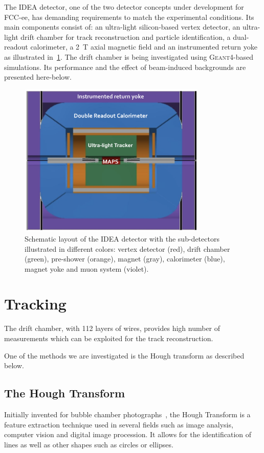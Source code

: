 \documentclass{cernatsnote}
\begin{document}
The IDEA detector, one of the two detector concepts under development for FCC-ee, has demanding requirements to match the experimental conditions. Its main components consist of: an ultra-light silicon-based vertex detector, an ultra-light drift chamber for track reconstruction and particle identification, a dual-readout calorimeter, a 2~T axial magnetic field and an instrumented return yoke as illustrated in~\cref{fig_IDEA}. The drift chamber is being investigated using \textsc{Geant4}-based simulations. Its performance and the effect of beam-induced backgrounds are presented here-below.

\begin{figure}[ht]
	\centering
	\includegraphics[width=0.8\textwidth]{figures/FCCeeIDEAConcept}%
	\caption{Schematic layout of the IDEA detector with the sub-detectors illustrated in different colors: vertex detector (red), drift chamber (green), pre-shower (orange), magnet (gray), calorimeter (blue), magnet yoke and muon system (violet).}
	\label{fig_IDEA}
\end{figure}



\section{Tracking}

The drift chamber, with 112 layers of wires, provides high number of measurements which can be exploited for the track reconstruction.

One of the methods we are investigated is the Hough transform as described below.

\subsection{The Hough Transform}
Initially invented for bubble chamber photographs~\cite{HTWikipedia}, the Hough Transform is a feature extraction technique used in several fields such as image analysis, computer vision and digital image procession. It allows for the identification of lines as well as other shapes such as circles or ellipses.
\end{document}
